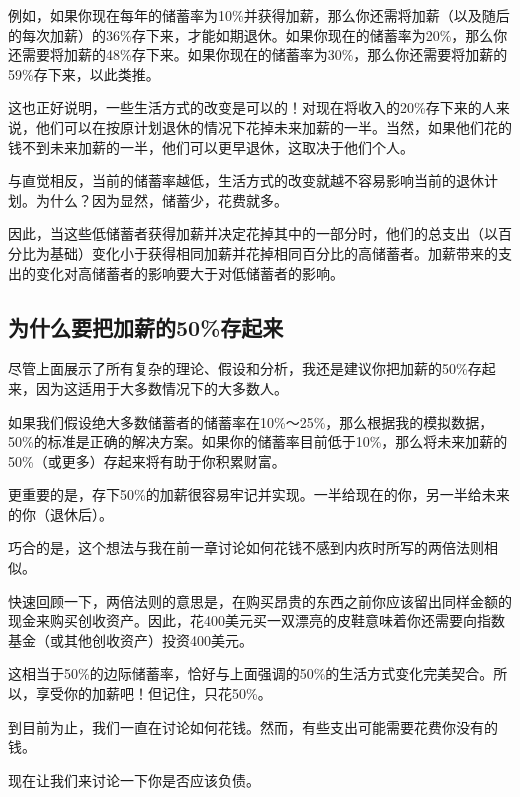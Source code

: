 例如，如果你现在每年的储蓄率为10\%并获得加薪，那么你还需将加薪（以及随后的每次加薪）的36\%存下来，才能如期退休。如果你现在的储蓄率为20\%，那么你还需要将加薪的48\%存下来。如果你现在的储蓄率为30\%，那么你还需要将加薪的59\%存下来，以此类推。

这也正好说明，一些生活方式的改变是可以的！对现在将收入的20\%存下来的人来说，他们可以在按原计划退休的情况下花掉未来加薪的一半。当然，如果他们花的钱不到未来加薪的一半，他们可以更早退休，这取决于他们个人。

与直觉相反，当前的储蓄率越低，生活方式的改变就越不容易影响当前的退休计划。为什么？因为显然，储蓄少，花费就多。

因此，当这些低储蓄者获得加薪并决定花掉其中的一部分时，他们的总支出（以百分比为基础）变化小于获得相同加薪并花掉相同百分比的高储蓄者。加薪带来的支出的变化对高储蓄者的影响要大于对低储蓄者的影响。

\subsection{为什么要把加薪的50\%存起来}
尽管上面展示了所有复杂的理论、假设和分析，我还是建议你把加薪的50\%存起来，因为这适用于大多数情况下的大多数人。

如果我们假设绝大多数储蓄者的储蓄率在10\%～25\%，那么根据我的模拟数据，50\%的标准是正确的解决方案。如果你的储蓄率目前低于10\%，那么将未来加薪的50\%（或更多）存起来将有助于你积累财富。

更重要的是，存下50\%的加薪很容易牢记并实现。一半给现在的你，另一半给未来的你（退休后）。

巧合的是，这个想法与我在前一章讨论如何花钱不感到内疚时所写的两倍法则相似。

快速回顾一下，两倍法则的意思是，在购买昂贵的东西之前你应该留出同样金额的现金来购买创收资产。因此，花400美元买一双漂亮的皮鞋意味着你还需要向指数基金（或其他创收资产）投资400美元。

这相当于50\%的边际储蓄率，恰好与上面强调的50\%的生活方式变化完美契合。所以，享受你的加薪吧！但记住，只花50\%。

到目前为止，我们一直在讨论如何花钱。然而，有些支出可能需要花费你没有的钱。

现在让我们来讨论一下你是否应该负债。

